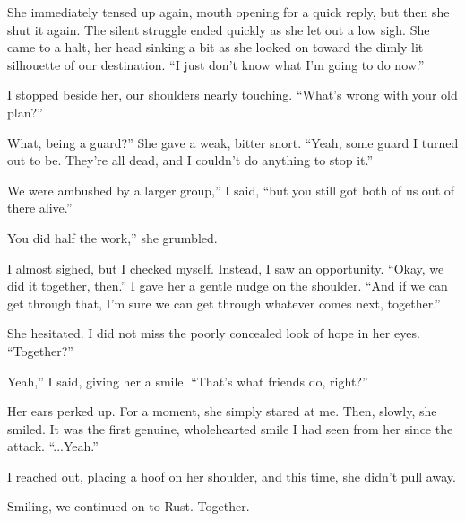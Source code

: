 She immediately tensed up again, mouth opening for a quick reply, but then she shut it again. The silent struggle ended quickly as she let out a low sigh. She came to a halt, her head sinking a bit as she looked on toward the dimly lit silhouette of our destination. “I just don’t know what I’m going to do now.”

I stopped beside her, our shoulders nearly touching. “What’s wrong with your old plan?”

\leavevmode{}What, being a guard?” She gave a weak, bitter snort. “Yeah, some guard I turned out to be. They’re all dead, and I couldn’t do anything to stop it.”

\leavevmode{}We were ambushed by a larger group,” I said, “but you still got both of us out of there alive.”

\leavevmode{}You did half the work,” she grumbled.

I almost sighed, but I checked myself. Instead, I saw an opportunity. “Okay, we did it together, then.” I gave her a gentle nudge on the shoulder. “And if we can get through that, I’m sure we can get through whatever comes next, together.”

She hesitated. I did not miss the poorly concealed look of hope in her eyes. “Together?”

\leavevmode{}Yeah,” I said, giving her a smile. “That’s what friends do, right?”

Her ears perked up. For a moment, she simply stared at me. Then, slowly, she smiled. It was the first genuine, wholehearted smile I had seen from her since the attack. “...Yeah.”

I reached out, placing a hoof on her shoulder, and this time, she didn’t pull away.

Smiling, we continued on to Rust. Together.